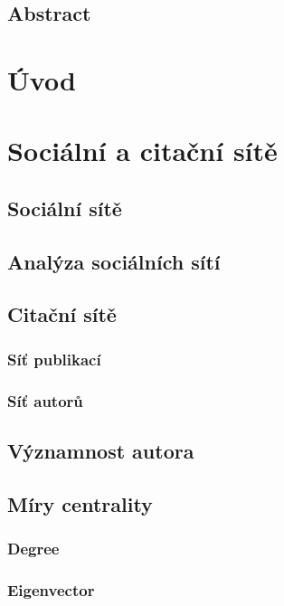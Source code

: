 \documentclass[12pt]{report}
\begin{document}
\section*{Abstract}
\lipsum

\tableofcontents

\chapter{Úvod}
\lipsum

\chapter{Sociální a citační sítě}
\lipsum
\section{Sociální sítě}
\lipsum

\section{Analýza sociálních sítí}
\lipsum

\section{Citační sítě}
\lipsum
\subsection{Síť publikací}
\lipsum
\subsection{Síť autorů}
\lipsum

\section{Významnost autora}
\lipsum

\section{Míry centrality}
\lipsum
\subsection{Degree}
\subsection{Eigenvector}
\end{document}
